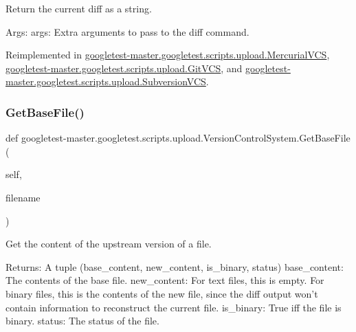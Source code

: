 \begin{DoxyVerb}Return the current diff as a string.

Args:
  args: Extra arguments to pass to the diff command.
\end{DoxyVerb}
 

Reimplemented in \mbox{\hyperlink{classgoogletest-master_1_1googletest_1_1scripts_1_1upload_1_1_mercurial_v_c_s_ab0fd31eda2de12901e484d6b1fea2673}{googletest-\/master.\+googletest.\+scripts.\+upload.\+Mercurial\+V\+CS}}, \mbox{\hyperlink{classgoogletest-master_1_1googletest_1_1scripts_1_1upload_1_1_git_v_c_s_a588378267f59aca16c80074bfcb51630}{googletest-\/master.\+googletest.\+scripts.\+upload.\+Git\+V\+CS}}, and \mbox{\hyperlink{classgoogletest-master_1_1googletest_1_1scripts_1_1upload_1_1_subversion_v_c_s_a25547b2a1179651ca489cd24c05072df}{googletest-\/master.\+googletest.\+scripts.\+upload.\+Subversion\+V\+CS}}.

\mbox{\label{classgoogletest-master_1_1googletest_1_1scripts_1_1upload_1_1_version_control_system_adfc913d49e48291939a9de8476a4c993}} 
\subsubsection{\texorpdfstring{GetBaseFile()}{GetBaseFile()}}
{\footnotesize\ttfamily def googletest-\/master.\+googletest.\+scripts.\+upload.\+Version\+Control\+System.\+Get\+Base\+File (\begin{DoxyParamCaption}\item[{}]{self,  }\item[{}]{filename }\end{DoxyParamCaption})}

\begin{DoxyVerb}Get the content of the upstream version of a file.

Returns:
  A tuple (base_content, new_content, is_binary, status)
base_content: The contents of the base file.
new_content: For text files, this is empty.  For binary files, this is
  the contents of the new file, since the diff output won't contain
  information to reconstruct the current file.
is_binary: True iff the file is binary.
status: The status of the file.
\end{DoxyVerb}
 

